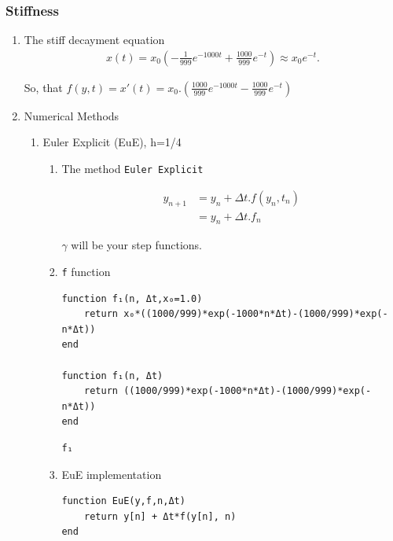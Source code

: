 \documentclass[11pt]{article}
\begin{document}
\subsubsection{Stiffness}
\label{sec:org1494448}
\begin{enumerate}
\item The stiff decayment equation
\label{sec:orgde07914}
\begin{equation}
\begin{aligned}
x(t)=x_{0}\left(-{\frac {1}{999}}e^{-1000t}+{\frac {1000}{999}}e^{-t}\right)\approx x_{0}e^{-t}.
\end{aligned}
\end{equation}


So, that \(f(y,t) = x'(t) = x_0.(\frac{1000}{999}e^{-1000t} - \frac{1000}{999}e^{-t})\)

\item Numerical Methods
\label{sec:org430136f}
\begin{enumerate}
\item Euler Explicit (EuE), h=1/4
\label{sec:org03f71c7}
\begin{enumerate}
\item The method
\label{sec:org163ca8d}
\texttt{Euler Explicit}

\begin{equation}
\begin{aligned}
y_{n+1}&=y_n + \Delta{t}.f(y_n, t_n) \\
&= y_n + \Delta{t}.f_n
\end{aligned}
\end{equation}

\(\gamma\) will be your step functions.

\item \texttt{f} function
\label{sec:orga5a5027}
\begin{verbatim}
function f₁(n, Δt,x₀=1.0)
    return x₀*((1000/999)*exp(-1000*n*Δt)-(1000/999)*exp(-n*Δt))
end

function f₁(n, Δt)
    return ((1000/999)*exp(-1000*n*Δt)-(1000/999)*exp(-n*Δt))
end
\end{verbatim}

\begin{verbatim}
f₁
\end{verbatim}

\item EuE implementation
\label{sec:org3054b5d}
\begin{verbatim}
function EuE(y,f,n,Δt)
    return y[n] + Δt*f(y[n], n)
end
\end{verbatim}


\end{enumerate}
\end{enumerate}
\end{enumerate}
\end{document}
